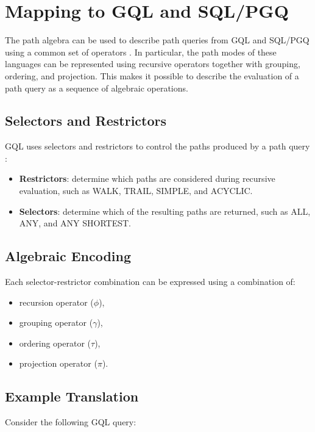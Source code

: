 \section{Mapping to GQL and SQL/PGQ}

The path algebra can be used to describe path queries from GQL and SQL/PGQ using a common set of operators \cite{angles2024path}. In particular, the path modes of these languages can be represented using recursive operators together with grouping, ordering, and projection. This makes it possible to describe the evaluation of a path query as a sequence of algebraic operations.

\subsection{Selectors and Restrictors}

GQL uses selectors and restrictors to control the paths produced by a path query \cite{angles2024path}:
\begin{itemize}
    \item \textbf{Restrictors}: determine which paths are considered during recursive evaluation, such as WALK, TRAIL, SIMPLE, and ACYCLIC.
    \item \textbf{Selectors}: determine which of the resulting paths are returned, such as ALL, ANY, and ANY SHORTEST.
\end{itemize}

\subsection{Algebraic Encoding}

Each selector-restrictor combination can be expressed using a combination of:

\begin{itemize}
    \item recursion operator ($\phi$),
    \item grouping operator ($\gamma$),
    \item ordering operator ($\tau$),
    \item projection operator ($\pi$).
\end{itemize}

\subsection{Example Translation}

Consider the following GQL query:

